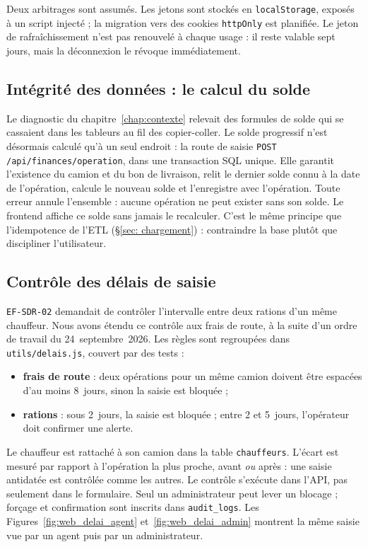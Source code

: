 Deux arbitrages sont assumés. Les jetons sont stockés en \texttt{localStorage}, exposés à un script injecté ; la migration vers des cookies \texttt{httpOnly} est planifiée. Le jeton de rafraîchissement n'est pas renouvelé à chaque usage : il reste valable sept jours, mais la déconnexion le révoque immédiatement.

\subsection{Intégrité des données : le calcul du solde}
\label{sec:webapp_integrity}

Le diagnostic du chapitre~\ref{chap:contexte} relevait des formules de solde qui se cassaient dans les tableurs au fil des copier-coller. Le solde progressif n'est désormais calculé qu'à un seul endroit : la route de saisie \texttt{POST /api/finances/operation}, dans une transaction SQL unique. Elle garantit l'existence du camion et du bon de livraison, relit le dernier solde connu à la date de l'opération, calcule le nouveau solde et l'enregistre avec l'opération. Toute erreur annule l'ensemble : aucune opération ne peut exister sans son solde. Le frontend affiche ce solde sans jamais le recalculer. C'est le même principe que l'idempotence de l'ETL (\S\ref{sec: chargement}) : contraindre la base plutôt que discipliner l'utilisateur.

\subsection{Contrôle des délais de saisie}
\label{sec:webapp_delais}

\texttt{EF-SDR-02} demandait de contrôler l'intervalle entre deux rations d'un même chauffeur. Nous avons étendu ce contrôle aux frais de route, à la suite d'un ordre de travail du 24~septembre~2026. Les règles sont regroupées dans \texttt{utils/delais.js}, couvert par des tests :
\begin{itemize}
    \item \textbf{frais de route} : deux opérations pour un même camion doivent être espacées d'au moins 8~jours, sinon la saisie est bloquée ;
    \item \textbf{rations} : sous 2~jours, la saisie est bloquée ; entre 2 et 5~jours, l'opérateur doit confirmer une alerte.
\end{itemize}
Le chauffeur est rattaché à son camion dans la table \texttt{chauffeurs}. L'écart est mesuré par rapport à l'opération la plus proche, avant \emph{ou} après : une saisie antidatée est contrôlée comme les autres. Le contrôle s'exécute dans l'API, pas seulement dans le formulaire. Seul un administrateur peut lever un blocage ; forçage et confirmation sont inscrits dans \texttt{audit\_logs}. Les Figures~\ref{fig:web_delai_agent} et~\ref{fig:web_delai_admin} montrent la même saisie vue par un agent puis par un administrateur.

